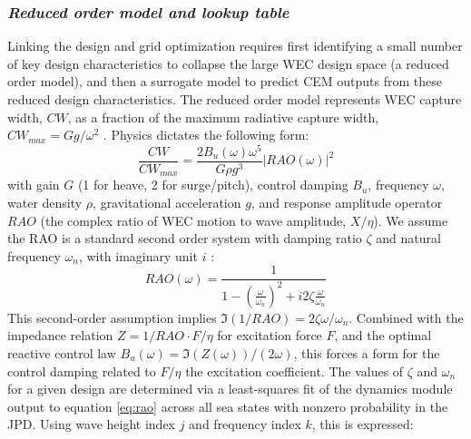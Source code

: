 \documentclass[10pt,twoside]{article}
\begin{document}
\subsubsection{\textit{Reduced order model and lookup table}}
Linking the design and grid optimization requires first identifying a small number of key design characteristics to collapse the large WEC design space (a reduced order model), and then a surrogate model to predict CEM outputs from these reduced design characteristics.
The reduced order model represents WEC capture width, $CW$, as a fraction of the maximum radiative capture width, $CW_{max}=Gg/\omega^2$ \cite{zou_practical_2023}. Physics dictates the following form:
\begin{equation}
    \label{eq:CW-fraction}
    \frac{CW}{CW_{max}} = \frac{2 B_u(\omega) \omega^5}{G \rho g^3} |RAO(\omega)|^2
\end{equation}
with gain $G$ (1 for heave, 2 for surge/pitch), control damping $B_u$, frequency $\omega$, water density $\rho$, gravitational acceleration $g$, and response amplitude operator $RAO$ (the complex ratio of WEC motion to wave amplitude, $X/\eta$).
We assume the RAO is a standard second order system with damping ratio $\zeta$ and natural frequency $\omega_n$, with imaginary unit $i$ \cite{franklin2014feedback}:
\begin{equation}
    \label{eq:rao}
    RAO(\omega) = \frac{1}{1-\left(\frac{\omega}{\omega_n}\right)^2 + i 2 \zeta \frac{\omega}{\omega_n}}
\end{equation}
This second-order assumption implies $\Im(1/RAO)=2\zeta\omega/\omega_n$.
Combined with the impedance relation $Z=1/RAO \cdot F/\eta$ for excitation force $F$, and the optimal reactive control law $B_u(\omega) = \Im(Z(\omega))/(2\omega)$, this forces a form for the control damping related to $F/\eta$ the excitation coefficient.
The values of $\zeta$ and $\omega_n$ for a given design are determined via a least-squares fit of the dynamics module output to equation \eqref{eq:rao} across all sea states with nonzero probability in the JPD.
Using wave height index $j$ and frequency index $k$, this is expressed:
\end{document}
